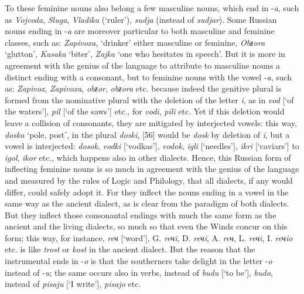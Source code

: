 To these feminine nouns also belong a few masculine nouns, which end in \linebreak{}-\textit{a}, such as \textit{Vojvoda}, \textit{Sluga}, \textit{Vladika} (‘ruler’), \textit{sudja} (instead of \textit{sudjar}). Some \linebreak{}Russian nouns ending in -\textit{a} are moreover particular to both masculine and feminine classes, such as: \textit{Zapivoxa}, ‘drinker’ either masculine or feminine, \textit{Obƶora} ‘glutton’, \textit{Kusaka} ‘biter’, \textit{Zajka} ‘one who hesitates in speech’. But it is more in agreement with the genius of the language to attribute to masculine nouns a distinct ending with a consonant, but to feminine nouns with the vowel -\textit{a}, such as: \textit{Zapivox}, \textit{Zapivoxa}, \textit{obƶor}, \textit{obƶora} etc. because indeed the genitive plural is formed from the nominative plural with the deletion of the letter \textit{i}, as in \textit{vod} [‘of the waters’], \textit{pil} [‘of the saws’] etc., for \textit{vodi}, \textit{pili} etc. Yet if this deletion would leave a collision of consonants, they are mitigated by interjected vowels: this way, \textit{doska} ‘pole, post’, in the plural \textit{doski}, [56] would be \textit{dosk} by deletion of \textit{i}, but a vowel is interjected: \textit{dosok}, \textit{vodki} [‘vodkas’], \textit{vodok}, \textit{igli} [‘needles’], \textit{ikri} [‘caviars’] to \textit{igol}, \textit{ikor} etc., which happens also in other dialects. Hence, this Russian form of inflecting feminine nouns is so much in agreement with the genius of the language and measured by the rules of Logic and Philology, that all dialects, if any would differ, could safely adopt it. For they inflect the nouns ending in a vowel in the same way as the ancient dialect, as is clear from the paradigm of both dialects. But they inflect those consonantal endings with much the same form as the ancient and the living dialects, so much so that even the Winds concur on this form; this way, for instance, \textit{reч} [‘word’], G. \textit{reчi}, D. \textit{reчi}, A. \textit{reч}, L. \textit{reчi}, I. \textit{reчio} etc. is like \textit{trost} or \textit{kost} in the ancient dialect. But the reason that the instrumental ends in -\textit{o} is that the southerners take delight in the letter -\textit{o} instead of -\textit{u}; the same occurs also in verbs, instead of \textit{budu} [‘to be’], \textit{budo}, instead of \textit{pisaju} [‘I write’], \textit{pisajo} etc.

